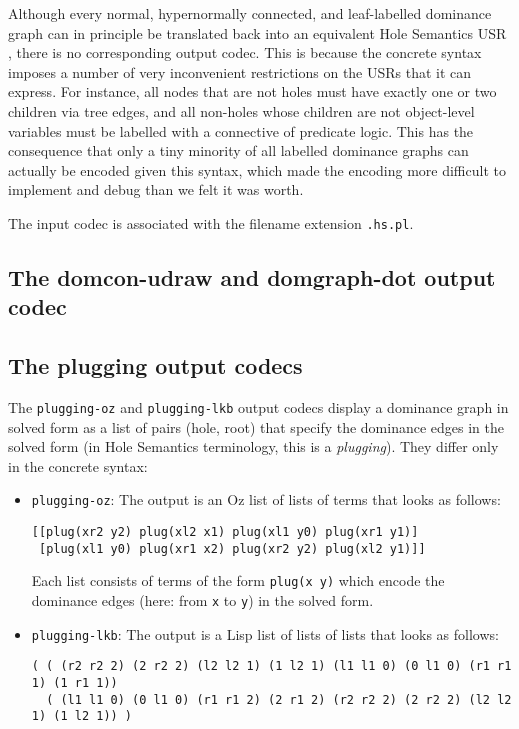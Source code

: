 Although every normal, hypernormally connected, and leaf-labelled
dominance graph can in principle be translated back into an equivalent
Hole Semantics USR \cite{KolNieTha03}, there is no corresponding
output codec. This is because the concrete syntax imposes a number of
very inconvenient restrictions on the USRs that it can express. For
instance, all nodes that are not holes must have exactly one or two
children via tree edges, and all non-holes whose children are not
object-level variables must be labelled with a connective of predicate
logic. This has the consequence that only a tiny minority of all
labelled dominance graphs can actually be encoded given this syntax,
which made the encoding more difficult to implement and debug than we
felt it was worth.

The input codec is associated with the filename extension \verb?.hs.pl?.




\subsection{The domcon-udraw and domgraph-dot output codec}






\subsection{The plugging output codecs}

The \verb?plugging-oz? and \verb?plugging-lkb? output codecs display a
dominance graph in solved form as a list of pairs (hole, root) that
specify the dominance edges in the solved form (in Hole Semantics
terminology, this is a \emph{plugging}). They differ only in the
concrete syntax:

\begin{itemize}
\item \verb?plugging-oz?: The output is an Oz list of lists of terms
  that looks as follows:
\begin{verbatim}
[[plug(xr2 y2) plug(xl2 x1) plug(xl1 y0) plug(xr1 y1)]
 [plug(xl1 y0) plug(xr1 x2) plug(xr2 y2) plug(xl2 y1)]]
\end{verbatim}
Each list consists of terms of the form \verb?plug(x y)? which encode
the dominance edges (here: from \verb?x? to \verb?y?) in the solved
form.
\item \verb?plugging-lkb?: The output is a Lisp list of lists of lists
  that looks as follows:
\begin{verbatim}
( ( (r2 r2 2) (2 r2 2) (l2 l2 1) (1 l2 1) (l1 l1 0) (0 l1 0) (r1 r1 1) (1 r1 1))
  ( (l1 l1 0) (0 l1 0) (r1 r1 2) (2 r1 2) (r2 r2 2) (2 r2 2) (l2 l2 1) (1 l2 1)) )
\end{verbatim}


\end{itemize}

